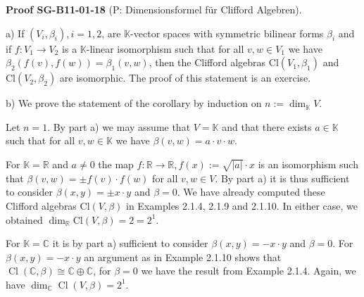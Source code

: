 \documentclass[10pt, letterpaper]{article}
\newcommand{\CustomHeading}[3]{%
  \par\medskip\noindent%
  \textbf{#1 #2} \textnormal{(#3)}.\enskip%
}
\newenvironment{PROOF}[2]{\begin{unitbox}\CustomHeading{Proof}{#1}{#2}}{\end{unitbox}}
\begin{document}
\begin{PROOF}{SG-B11-01-18}{P: Dimensionsformel für Clifford Algebren}
a) If $\left(V_{i}, \beta_{i}\right), i=1,2$, are $\mathbb{K}$-vector spaces with symmetric bilinear forms $\beta_{i}$ and if $f: V_{1} \rightarrow V_{2}$ is a $\mathbb{K}$-linear isomorphism such that for all $v, w \in V_{1}$ we have $\beta_{2}(f(v), f(w))=\beta_{1}(v, w)$, then the Clifford algebras $\mathrm{Cl}\left(V_{1}, \beta_{1}\right)$ and $\mathrm{Cl}\left(V_{2}, \beta_{2}\right)$ are isomorphic. The proof of this statement is an exercise.


b) We prove the statement of the corollary by induction on $n:=\operatorname{dim}_{\mathbb{K}} V$.

Let $n=1$. By part a) we may assume that $V=\mathbb{K}$ and that there exists $a \in \mathbb{K}$ such that for all $v, w \in \mathbb{K}$ we have $\beta(v, w)=a \cdot v \cdot w$.

For $\mathbb{K}=\mathbb{R}$ and $a \neq 0$ the map $f: \mathbb{R} \rightarrow \mathbb{R}, f(x):=\sqrt{|a|} \cdot x$ is an isomorphism such that $\beta(v, w)= \pm f(v) \cdot f(w)$ for all $v, w \in V$. By part a) it is thus sufficient to consider $\beta(x, y)= \pm x \cdot y$ and $\beta=0$. We have already computed these Clifford algebras $\mathrm{Cl}(V, \beta)$ in Examples 2.1.4, 2.1.9 and 2.1.10. In either case, we obtained $\operatorname{dim}_{\mathbb{R}} \mathrm{Cl}(V, \beta)=2=2^{1}$.

For $\mathbb{K}=\mathbb{C}$ it is by part a) sufficient to consider $\beta(x, y)=-x \cdot y$ and $\beta=0$. For $\beta(x, y)=-x \cdot y$ an argument as in Example 2.1.10 shows that $\operatorname{Cl}(\mathbb{C}, \beta) \cong \mathbb{C} \oplus \mathbb{C}$, for $\beta=0$ we have the result from Example 2.1.4. Again, we have $\operatorname{dim}_{\mathbb{C}} \operatorname{Cl}(V, \beta)=2^{1}$.


\end{PROOF}
\end{document}
